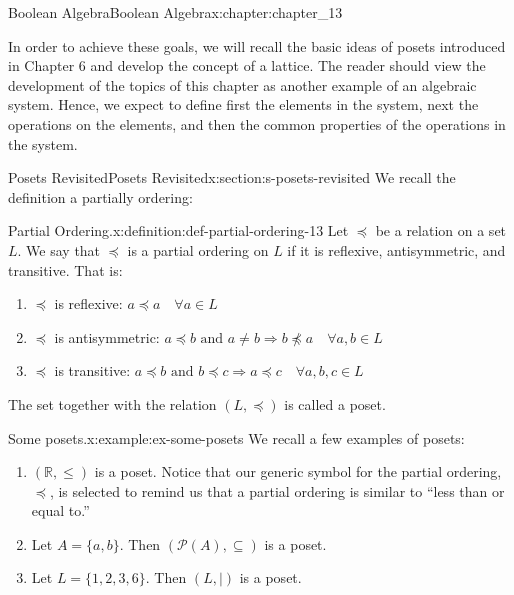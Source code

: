 \documentclass[twoside,10pt,]{book}
\numberwithin{equation}{section}
\begin{document}
\begin{chapterptx}{Boolean Algebra}{}{Boolean Algebra}{}{}{x:chapter:chapter_13}
\begin{introduction}{}
\par
In order to achieve these goals, we will recall the basic ideas of posets introduced in Chapter 6 and develop the concept of a lattice.  The reader should view the development of the topics of this chapter as another example of an algebraic system. Hence, we expect to define first the elements in the system, next the operations on the elements, and then the common properties of the operations in the system.%
\end{introduction}%
%
%
\typeout{************************************************}
\typeout{************************************************}
%
\begin{sectionptx}{Posets Revisited}{}{Posets Revisited}{}{}{x:section:s-posets-revisited}
%
We recall the definition a partially ordering:%
\begin{definition}{Partial Ordering.}{x:definition:def-partial-ordering-13}%
%
Let \(\preceq\) be a relation on a set \(L\).  We say that \(\preceq\) is a partial ordering on \(L\) if it is reflexive, antisymmetric, and transitive.  That is:%
\begin{enumerate}[label=(\arabic*)]
\item{}\(\preceq\) is reflexive: \(a \preceq a  \quad \forall a \in L\)%
\item{}\(\preceq\) is antisymmetric: \(a \preceq b \textrm{ and } a \neq b \Rightarrow b \npreceq a \quad \forall a,b \in L\)%
\item{}\(\preceq\) is transitive: \(a \preceq b \textrm{ and } b \preceq c \Rightarrow a \preceq c \quad \forall a,b,c \in L\)%
\end{enumerate}
The set together with the relation \((L, \preceq)\) is called a poset.%
\end{definition}
\begin{example}{Some posets.}{x:example:ex-some-posets}%
We recall a few examples of posets:%
\begin{enumerate}[label=(\alph*)]
\item{}\((\mathbb{R}, \leq)\) is a poset.  Notice that our generic symbol for the partial ordering, \(\preceq\), is selected to remind us that a partial ordering is similar to ``less than or equal to.''%
\item{}Let \(A=\{a,b\}\). Then \((\mathcal{P}(A) ,\subseteq)\) is a poset.%
\item{}Let \(L = \{1, 2, 3, 6\}\). Then  \((L,\mid)\) is a poset.%
\end{enumerate}

\end{example}
\end{sectionptx}
\end{chapterptx}
\end{document}
